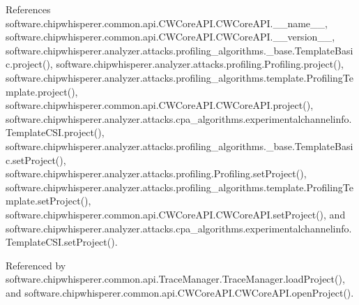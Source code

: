 References software.\+chipwhisperer.\+common.\+api.\+C\+W\+Core\+A\+P\+I.\+C\+W\+Core\+A\+P\+I.\+\_\+\+\_\+name\+\_\+\+\_\+, software.\+chipwhisperer.\+common.\+api.\+C\+W\+Core\+A\+P\+I.\+C\+W\+Core\+A\+P\+I.\+\_\+\+\_\+version\+\_\+\+\_\+, software.\+chipwhisperer.\+analyzer.\+attacks.\+profiling\+\_\+algorithms.\+\_\+base.\+Template\+Basic.\+project(), software.\+chipwhisperer.\+analyzer.\+attacks.\+profiling.\+Profiling.\+project(), software.\+chipwhisperer.\+analyzer.\+attacks.\+profiling\+\_\+algorithms.\+template.\+Profiling\+Template.\+project(), software.\+chipwhisperer.\+common.\+api.\+C\+W\+Core\+A\+P\+I.\+C\+W\+Core\+A\+P\+I.\+project(), software.\+chipwhisperer.\+analyzer.\+attacks.\+cpa\+\_\+algorithms.\+experimentalchannelinfo.\+Template\+C\+S\+I.\+project(), software.\+chipwhisperer.\+analyzer.\+attacks.\+profiling\+\_\+algorithms.\+\_\+base.\+Template\+Basic.\+set\+Project(), software.\+chipwhisperer.\+analyzer.\+attacks.\+profiling.\+Profiling.\+set\+Project(), software.\+chipwhisperer.\+analyzer.\+attacks.\+profiling\+\_\+algorithms.\+template.\+Profiling\+Template.\+set\+Project(), software.\+chipwhisperer.\+common.\+api.\+C\+W\+Core\+A\+P\+I.\+C\+W\+Core\+A\+P\+I.\+set\+Project(), and software.\+chipwhisperer.\+analyzer.\+attacks.\+cpa\+\_\+algorithms.\+experimentalchannelinfo.\+Template\+C\+S\+I.\+set\+Project().



Referenced by software.\+chipwhisperer.\+common.\+api.\+Trace\+Manager.\+Trace\+Manager.\+load\+Project(), and software.\+chipwhisperer.\+common.\+api.\+C\+W\+Core\+A\+P\+I.\+C\+W\+Core\+A\+P\+I.\+open\+Project().


